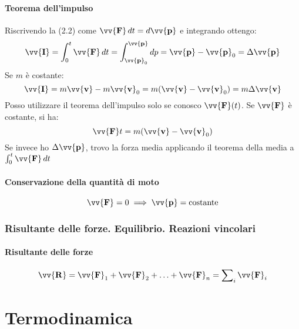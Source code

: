 \documentclass{report}
\newcommand{\vett}[1]{\vv{\boldsymbol{\mathbf{#1}}}}
\begin{document}
\subsection{Teorema dell'impulso}
Riscrivendo la (2.2) come \(\vett{F}\,dt = d\vett{p}\) e integrando ottengo:
\begin{equation}
    \vett{I} = \int_{0}^{t}\vett{F}\,dt = \int_{\vett{p}_0}^{\vett{p}}dp
    = \vett{p} - \vett{p}_0 = \Delta\vett{p}
\end{equation}
Se \(m\) è costante:
\begin{equation*}
    \vett{I} = m\vett{v} - m\vett{v}_0 = m(\vett{v} - \vett{v}_0) = m\Delta\vett{v}
\end{equation*}
Posso utilizzare il teorema dell'impulso solo se conosco \(\vett{F}(t)\).
Se \(\vett{F}\) è costante, si ha:
\begin{equation*}
    \vett{F}t = m(\vett{v} - \vett{v}_0)
\end{equation*}
Se invece ho \(\Delta\vett{p}\), trovo la forza media applicando il 
teorema della media a \(\int_{0}^{t}\vett{F}\,dt\)

\subsection{Conservazione della quantità di moto}
\begin{equation*}
    \vett{F} = 0 \implies \vett{p} = \text{costante}
\end{equation*}

\section{Risultante delle forze. Equilibrio. Reazioni vincolari}
\subsection{Risultante delle forze}
\begin{equation*}
    \vett{R} = \vett{F}_1 + \vett{F}_2 + \ldots + \vett{F}_n = \sum\nolimits_i \vett{F}_i
\end{equation*}

\part{Termodinamica}
\end{document}
